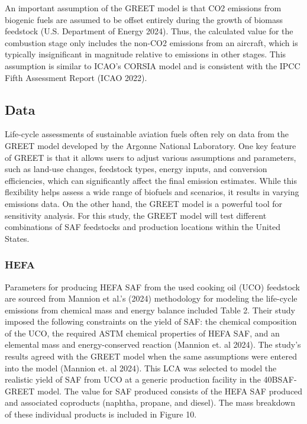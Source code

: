 \documentclass[12pt]{article}
\begin{document}
\begin{Appendix}
An important assumption of the GREET model is that CO2 emissions from biogenic fuels are assumed to be offset entirely during the growth of biomass feedstock (U.S. Department of Energy 2024). Thus, the calculated value for the combustion stage only includes the non-CO2 emissions from an aircraft, which is typically insignificant in magnitude relative to emissions in other stages. This assumption is similar to ICAO’s CORSIA model and is consistent with the IPCC Fifth Assessment Report (ICAO 2022). 

\subsection{Data}

Life-cycle assessments of sustainable aviation fuels often rely on data from the GREET model developed by the Argonne National Laboratory. One key feature of GREET is that it allows users to adjust various assumptions and parameters, such as land-use changes, feedstock types, energy inputs, and conversion efficiencies, which can significantly affect the final emission estimates. While this flexibility helps assess a wide range of biofuels and scenarios, it results in varying emissions data. On the other hand, the GREET model is a powerful tool for sensitivity analysis. For this study, the GREET model will test different combinations of SAF feedstocks and production locations within the United States.

\subsubsection{HEFA}

Parameters for producing HEFA SAF from the used cooking oil (UCO) feedstock are sourced from Mannion et al.’s (2024) methodology for modeling the life-cycle emissions from chemical mass and energy balance included Table 2. Their study imposed the following constraints on the yield of SAF: the chemical composition of the UCO, the required ASTM chemical properties of HEFA SAF, and an elemental mass and energy-conserved reaction (Mannion et. al 2024).  The study’s results agreed with the GREET model when the same assumptions were entered into the model  (Mannion et. al 2024). This LCA was selected to model the realistic yield of SAF from UCO at a generic production facility in the 40BSAF-GREET model. The value for SAF produced consists of the HEFA SAF produced and associated coproducts (naphtha, propane, and diesel). The mass breakdown of these individual products is included in Figure 10.


\end{Appendix}
\end{document}
